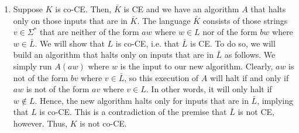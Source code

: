 \documentclass[letterpaper,11pt]{article}
\begin{document}
\begin{enumerate}
\begin{enumerate}
            \item
                Suppose $K$ is co-CE. Then, $\bar K$ is CE and we have an
                algorithm $A$ that halts only on those inputs that are in
                $\bar K$. The language $\bar K$ consists of those strings
                $v \in \Sigma^*$ that are neither of the form $aw$ where
                $w \in L$ nor of the form $bw$ where $w \in \bar L$. We will
                show that $L$ is co-CE, i.e. that $\bar L$ is CE. To do so,
                we will build an algorithm that halts only on inputs that are
                in $\bar L$ as follows. We simply run $A(aw)$ where $w$ is the
                input to our new algorithm. Clearly, $aw$ is not of the form
                $bv$ where $v \in \bar L$, so this execution of $A$ will halt
                if and only if $aw$ is not of the form $av$ where $v \in L$.
                In other words, it will only halt if $w \notin L$. Hence, the
                new algorithm halts only for inputs that are in $\bar L$,
                implying that $L$ is co-CE. This is a contradiction of the
                premise that $\bar L$ is not CE, however. Thus, $K$ is not
                co-CE.
        \end{enumerate}
\end{enumerate}
\end{document}
